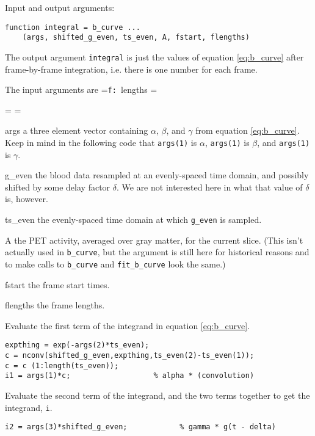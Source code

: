 \documentclass[12pt]{article}
\def\code#1{{\tt #1}}
\def\ttlabel#1{{\tt #1: }}
\newenvironment{ttdescription}[1]
{\newbox\holder
 \setbox\holder=\hbox{\ttlabel#1}
 \dimen0=\wd\holder
 \begin{list}{}
 {\labelsep=-0.25in
  \rightmargin=0.25in
  \leftmargin=\dimen0
  \addtolength{\leftmargin}{0.25in}
  \labelwidth=\leftmargin
  \let\makelabel\ttlabel}}%
{\end{list}}
\begin{document}
\begin{enumerate}

\item Input and output arguments:
\begin{verbatim}
function integral = b_curve ...
    (args, shifted_g_even, ts_even, A, fstart, flengths)
\end{verbatim}
  The output argument \code{integral} is just the values of equation
  \ref{eq:b_curve} after frame-by-frame integration, i.e. there is one
  number for each frame.

  The input arguments are
  \begin{ttdescription}{flengths}
  \item[args]a three element vector containing $\alpha$, $\beta$, and
    $\gamma$ from equation \ref{eq:b_curve}.  Keep in mind in the
    following code that \code{args(1)} is $\alpha$, \code{args(1)} is
    $\beta$, and \code{args(1)} is $\gamma$.
  \item[g\_even]the blood data resampled at an evenly-spaced time
    domain, and possibly shifted by some delay factor $\delta$.  We
    are not interested here in what that value of $\delta$ is,
    however.
  \item[ts\_even]the evenly-spaced time domain at which \code{g\_even}
    is sampled.
  \item[A]the PET activity, averaged over gray matter, for the current
    slice.  (This isn't actually used in \code{b\_curve}, but the
    argument is still here for historical reasons and to make calls
    to \code{b\_curve} and \code{fit\_b\_curve} look the same.)
  \item[fstart]the frame start times.
  \item[flengths]the frame lengths.
  \end{ttdescription}

\item Evaluate the first term of the integrand in equation \ref{eq:b_curve}.
\begin{verbatim}
expthing = exp(-args(2)*ts_even);
c = nconv(shifted_g_even,expthing,ts_even(2)-ts_even(1));
c = c (1:length(ts_even));
i1 = args(1)*c;                   % alpha * (convolution)
\end{verbatim}

\item Evaluate the second term of the integrand, and the two terms
  together to get the integrand, \code{i}.
\begin{verbatim}
i2 = args(3)*shifted_g_even;            % gamma * g(t - delta)


\end{verbatim}
\end{enumerate}
\end{document}
